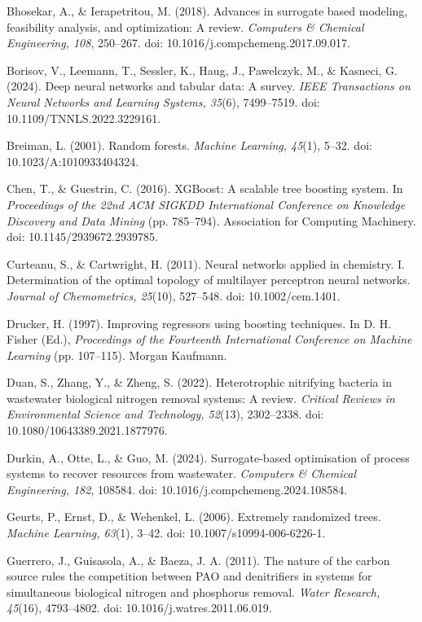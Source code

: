 \documentclass[a4paper,fleqn]{cas-sc}
\begin{document}
\noindent Bhosekar, A., \& Ierapetritou, M. (2018). Advances in surrogate based modeling, feasibility analysis, and optimization: A review. \textit{Computers \& Chemical Engineering, 108}, 250--267. doi: 10.1016/j.compchemeng.2017.09.017.

\noindent Borisov, V., Leemann, T., Sessler, K., Haug, J., Pawelczyk, M., \& Kasneci, G. (2024). Deep neural networks and tabular data: A survey. \textit{IEEE Transactions on Neural Networks and Learning Systems, 35}(6), 7499--7519. doi: 10.1109/TNNLS.2022.3229161.

\noindent Breiman, L. (2001). Random forests. \textit{Machine Learning, 45}(1), 5--32. doi: 10.1023/A:1010933404324.

\noindent Chen, T., \& Guestrin, C. (2016). XGBoost: A scalable tree boosting system. In \textit{Proceedings of the 22nd ACM SIGKDD International Conference on Knowledge Discovery and Data Mining} (pp. 785--794). Association for Computing Machinery. doi: 10.1145/2939672.2939785.

\noindent Curteanu, S., \& Cartwright, H. (2011). Neural networks applied in chemistry. I. Determination of the optimal topology of multilayer perceptron neural networks. \textit{Journal of Chemometrics, 25}(10), 527--548. doi: 10.1002/cem.1401.

\noindent Drucker, H. (1997). Improving regressors using boosting techniques. In D. H. Fisher (Ed.), \textit{Proceedings of the Fourteenth International Conference on Machine Learning} (pp. 107--115). Morgan Kaufmann.

\noindent Duan, S., Zhang, Y., \& Zheng, S. (2022). Heterotrophic nitrifying bacteria in wastewater biological nitrogen removal systems: A review. \textit{Critical Reviews in Environmental Science and Technology, 52}(13), 2302--2338. doi: 10.1080/10643389.2021.1877976.

\noindent Durkin, A., Otte, L., \& Guo, M. (2024). Surrogate-based optimisation of process systems to recover resources from wastewater. \textit{Computers \& Chemical Engineering, 182}, 108584. doi: 10.1016/j.compchemeng.2024.108584.

\noindent Geurts, P., Ernst, D., \& Wehenkel, L. (2006). Extremely randomized trees. \textit{Machine Learning, 63}(1), 3--42. doi: 10.1007/s10994-006-6226-1.

\noindent Guerrero, J., Guisasola, A., \& Baeza, J. A. (2011). The nature of the carbon source rules the competition between PAO and denitrifiers in systems for simultaneous biological nitrogen and phosphorus removal. \textit{Water Research, 45}(16), 4793--4802. doi: 10.1016/j.watres.2011.06.019.
\end{document}
